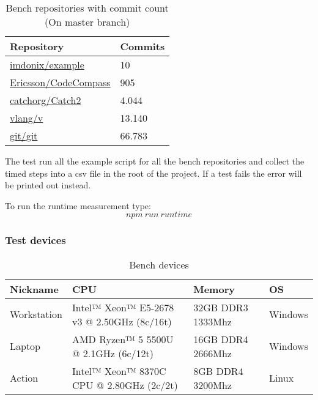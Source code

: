 \begin{table}[H]
	\centering
	\begin{tabular}{ | m{} | m{} | }
		\hline
		\textbf{Repository} & \textbf{Commits} \\
		\hline \hline
		\href{https://github.com/imdonix/example}{imdonix/example} & 10 \\
		\hline
		\href{https://github.com/Ericsson/CodeCompass}{Ericsson/CodeCompass} & 905 \\
		\hline
		\href{https://github.com/catchorg/Catch2}{catchorg/Catch2} & 4.044 \\
		\hline
		\href{https://github.com/vlang/v}{vlang/v} & 13.140 \\
		\hline
		\href{https://github.com/git/git}{git/git} & 66.783 \\
		\hline
	\end{tabular}
	\caption{Bench repositories with commit count (On master branch)}
	\label{tab:runtime}
\end{table}

The test run all the example script for all the bench repositories and collect the timed steps into a csv file in the root of the project. If a test fails the error will be printed out instead.

To run the runtime measurement type:
\[npm\ run\ runtime\]

\subsubsection{Test devices}

\begin{table}[H]
	\centering
	\begin{tabular}{ | m{} | m{} | m{} |  m{} | }
		\hline
		\textbf{Nickname} & \textbf{CPU} & \textbf{Memory} & \textbf{OS}  \\
		\hline \hline
		Workstation & Intel™ Xeon™ E5-2678 v3 @ 2.50GHz (8c/16t) & 32GB DDR3 1333Mhz  & Windows \\ 
		\hline
		Laptop & AMD Ryzen™ 5 5500U @ 2.1GHz (6c/12t) & 16GB DDR4 2666Mhz & Windows \\
		\hline
		Action & Intel™ Xeon™ 8370C CPU @ 2.80GHz (2c/2t) & 8GB DDR4 3200Mhz & Linux \\
		\hline
	\end{tabular}
	\caption{Bench devices}
	\label{tab:devices}
\end{table}

